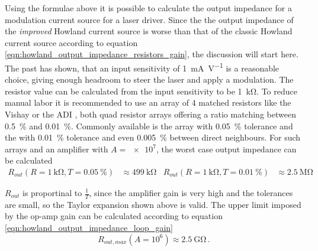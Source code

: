 Using the formulae above it is possible to calculate the output impedance for a modulation current source for a laser driver. Since the the output impedance of the \textit{improved} Howland current source is worse than that of the classic Howland current source according to equation \ref{eqn:howland_output_impedance_resistors_gain}, the discussion will start here. The past has shown, that an input sensitivity of \qty{1}{\mA \per \V} is a reasonable choice, giving enough headroom to steer the laser and apply a modulation. The resistor value can be calculated from the input sensitivity to be \qty{1}{\kilo\ohm}. To reduce manual labor it is recommended to use an array of \num{4} matched resistors like the Vishay  \cite{datasheet_MORN} or the ADI  \cite{datasheet_LT5400}, both quad resistor arrays offering a ratio matching between \qty{0.5}{\percent} and \qty{0.01}{\percent}. Commonly available is the  array with \qty{0.05}{\percent} tolerance and the  with \qty{0.01}{\percent} tolerance and even \qty{0.005}{\percent} between direct neighbours. For such arrays and an amplifier with $A=\num{e7}$, the worst case output impedance can be calculated
\begin{align*}
    R_{out}(R=\qty{1}{\kilo\ohm}, T=\qty{0.05}{\percent}) &\approx \qty{499}{\kilo\ohm} & R_{out}(R=\qty{1}{\kilo\ohm}, T=\qty{0.01}{\percent}) &\approx \qty{2.5}{\mega\ohm}
\end{align*}

$R_{out}$ is proportinal to $\frac{1}{T}$, since the amplifier gain is very high and the tolerances are small, so the Taylor expansion shown above is valid. The upper limit imposed by the op-amp gain can be calculated according to equation \ref{eqn:howland_output_impedance_loop_gain}
\begin{equation*}
    R_{out, max} (A=10^6) \approx \qty{2.5}{\giga\ohm}\,.
\end{equation*}

